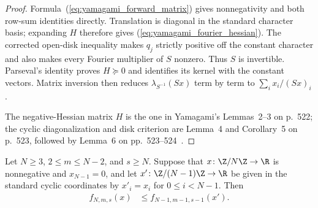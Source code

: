 \begin{proof}
    \leanok
    Formula~(\ref{eq:yamagami_forward_matrix}) gives nonnegativity and both
    row-sum identities directly.  Translation is diagonal in the standard
    character basis; expanding $H$ therefore gives
    (\ref{eq:yamagami_fourier_hessian}).  The corrected open-disk inequality
    makes $q_j$ strictly positive off the constant character and also makes
    every Fourier multiplier of $S$ nonzero.  Thus $S$ is invertible.
    Parseval's identity proves $H\succeq0$ and identifies its kernel with the
    constant vectors.  Matrix inversion then reduces
    $\lambda_{S^{-1}}(Sx)$ term by term to $\sum_i x_i/(Sx)_i$.

    The negative-Hessian matrix $H$ is the one in Yamagami's Lemmas~2--3 on
    p.~522; the cyclic diagonalization and disk criterion are Lemma~4 and
    Corollary~5 on p.~523, followed by Lemma~6 on
    pp.~523--524~\cite{Yamagami1993Cyclic}.
\end{proof}

\begin{theorem}
    \label{thm:yamagami_regular_boundary_recurrence}
    \leanok
    Let $N\ge3$, $2\le m\le N-2$, and $s\ge N$.  Suppose that
    $x\colon\Z/N\Z\to\R$ is nonnegative and $x_{N-1}=0$, and let
    $x'\colon\Z/(N-1)\Z\to\R$ be given in the standard cyclic coordinates by
    $x'_i=x_i$ for $0\le i<N-1$.  Then
    \begin{align}
        f_{N,m,s}(x)&\le f_{N-1,m-1,s-1}(x').
        \label{eq:yamagami_regular_boundary_recurrence}
    \end{align}
\end{theorem}


